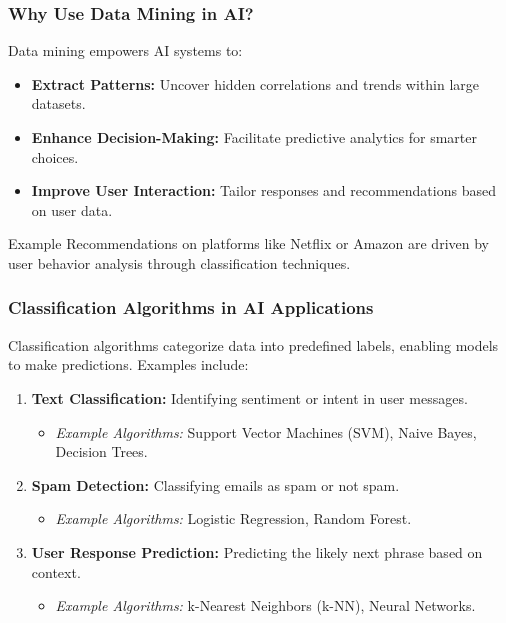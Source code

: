\documentclass[aspectratio=169]{beamer}
\begin{document}
\begin{frame}[fragile]
    \frametitle{Why Use Data Mining in AI?}
    Data mining empowers AI systems to:
    \begin{itemize}
        \item \textbf{Extract Patterns:} Uncover hidden correlations and trends within large datasets.
        \item \textbf{Enhance Decision-Making:} Facilitate predictive analytics for smarter choices.
        \item \textbf{Improve User Interaction:} Tailor responses and recommendations based on user data.
    \end{itemize}
    \begin{block}{Example}
        Recommendations on platforms like Netflix or Amazon are driven by user behavior analysis through classification techniques.
    \end{block}
\end{frame}

\begin{frame}[fragile]
    \frametitle{Classification Algorithms in AI Applications}
    Classification algorithms categorize data into predefined labels, enabling models to make predictions. Examples include:
    \begin{enumerate}
        \item \textbf{Text Classification:} Identifying sentiment or intent in user messages.
            \begin{itemize}
                \item \textit{Example Algorithms:} Support Vector Machines (SVM), Naive Bayes, Decision Trees.
            \end{itemize}
        \item \textbf{Spam Detection:} Classifying emails as spam or not spam.
            \begin{itemize}
                \item \textit{Example Algorithms:} Logistic Regression, Random Forest.
            \end{itemize}
        \item \textbf{User Response Prediction:} Predicting the likely next phrase based on context.
            \begin{itemize}
                \item \textit{Example Algorithms:} k-Nearest Neighbors (k-NN), Neural Networks.
            \end{itemize}
    \end{enumerate}
\end{frame}
\end{document}
